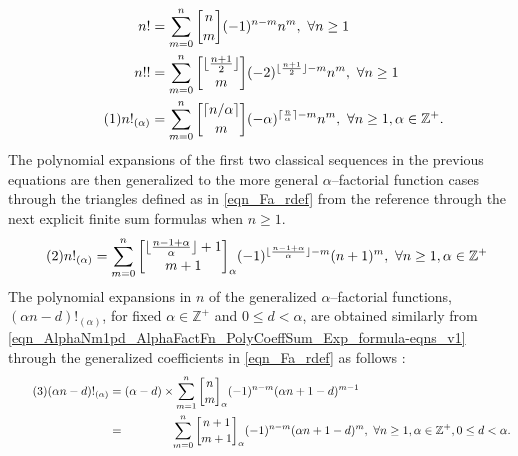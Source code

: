 \documentclass[12pt,reqno]{article}
\numberwithin{sfootnote}{section}
\numberwithin{equation}{section}
\newcommand{\tagonce}[0]{
     \addtocounter{equation}{1}
     \tag{\theequation}
}
\theoremstyle{DefaultTheoremStyle}
\theoremstyle{definition}
\newcommand{\cf}[0]{cf.\ }
\newcommand{\gkpSI}[2]{\ensuremath{\genfrac{\lbrack}{\rbrack}{0pt}{}{#1}{#2}}}
\newcommand{\FcfII}[3]{\ensuremath{\gkpSI{#2}{#3}_{#1}}}
\newcommand{\MultiFactorial}[2]{\ensuremath{#1!_{\left(#2\right)}}}
\newcommand{\AlphaFactorial}[2]{\ensuremath{\left(#1\right)!_{\left(#2\right)}}}
\begin{document}
\begin{align*} 
n! & = \sum_{m=0}^{n} \gkpSI{n}{m} (-1)^{n-m} n^m,\ \forall n \geq 1 \\ 
n!! & = \sum_{m=0}^{n} \gkpSI{\lfloor \frac{n+1}{2} \rfloor}{m} 
     (-2)^{\lfloor \frac{n+1}{2} \rfloor - m} n^{m},\ \forall n \geq 1 \\ 
\tagonce\label{eqn_AlphaNm1pd_AlphaFactFn_PolyCoeffSum_Exp_formula-eqns_v3} 
\MultiFactorial{n}{\alpha} & = 
     \sum_{m=0}^{n} 
     \gkpSI{\lceil n / \alpha \rceil}{m} 
     (-\alpha)^{\lceil \frac{n}{\alpha} \rceil - m} n^{m},\ 
     \forall n \geq 1, \alpha \in \mathbb{Z}^{+}. 
\end{align*} 
The polynomial expansions of the first two classical sequences 
in the previous equations are then generalized to the 
more general $\alpha$--factorial function cases 
through the triangles defined as in \eqref{eqn_Fa_rdef} 
from the reference \citep{MULTIFACTJIS} through the 
next explicit finite sum formulas when $n \geq 1$. 
\begin{align*} 
\tagonce\label{eqn_AlphaNm1pd_AlphaFactFn_PolyCoeffSum_Exp_formula-eqns_v1} 
\MultiFactorial{n}{\alpha} & = 
     \sum_{m=0}^{n} 
     \FcfII{\alpha}{\lfloor \frac{n-1+\alpha}{\alpha} \rfloor + 1}{m+1} 
     (-1)^{\lfloor \frac{n-1+\alpha}{\alpha} \rfloor - m} 
     (n+1)^{m},\ 
     \forall n \geq 1, \alpha \in \mathbb{Z}^{+} 
\end{align*} 
The polynomial expansions in $n$ of the generalized 
$\alpha$--factorial functions, $\AlphaFactorial{\alpha n-d}{\alpha}$, 
for fixed $\alpha \in \mathbb{Z}^{+}$ and $0 \leq d < \alpha$, 
are obtained similarly from 
\eqref{eqn_AlphaNm1pd_AlphaFactFn_PolyCoeffSum_Exp_formula-eqns_v1} 
through the generalized coefficients in 
\eqref{eqn_Fa_rdef} as follows \citep[\cf \S 2]{MULTIFACTJIS}: 
\begin{align*} 
\tagonce\label{eqn_AlphaNm1pd_AlphaFactFn_PolyCoeffSum_Exp_formula-eqns_v2} 
(\alpha n-d)!_{(\alpha)} 
     & = 
     (\alpha - d) \times 
     \sum_{m=1}^{n} \FcfII{\alpha}{n}{m} (-1)^{n-m} 
     (\alpha n + 1 - d)^{m-1} \\ 
     & = 
     \phantom{(\alpha - d) \times} 
     \sum_{m=0}^{n} \FcfII{\alpha}{n+1}{m+1} (-1)^{n-m} 
     (\alpha n + 1 - d)^{m},\ 
     \forall n \geq 1, \alpha \in \mathbb{Z}^{+}, 0 \leq d < \alpha. 
\end{align*} 
\end{document}
